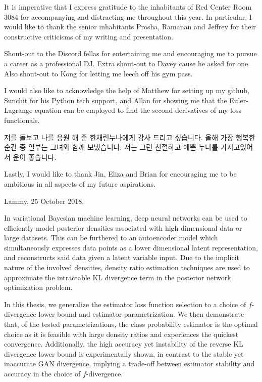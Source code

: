 \documentclass[honours,12pt, twoside]{unswthesis}
\numberwithin{equation}{section}
\theoremstyle{definition}
\begin{document}
{\bigskip\noindent}It is imperative that I express gratitude to the inhabitants of Red Center Room 3084 for accompanying and distracting me throughout this year. In particular, I would like to thank the senior inhabitants Prosha, Ramanan and Jeffrey for their constructive criticisms of my writing and presentation.

{\bigskip\noindent}Shout-out to the Discord fellas for entertaining me and encouraging me to pursue a career as a professional DJ. Extra shout-out to Davey cause he asked for one. Also shout-out to Kong for letting me leech off his gym pass.

{\bigskip\noindent}I would also like to acknowledge the help of Matthew for setting up my github, Sunchit for his Python tech support, and Allan for showing me that the Euler-Lagrange equation can be employed to find the second derivatives of my loss functionals.

{\bigskip\noindent}저를 돌보고 나를 응원 해 준 한채린누나에게 감사 드리고 싶습니다. 올해 가장 행복한 순간 중 일부는 그녀와 함께 보냈습니다. 저는 그런 친절하고 예쁜 누나를 가지고있어서 운이 좋습니다.

{\bigskip\noindent}Lastly, I would like to thank Jin, Eliza and Brian for encouraging me to be ambitious in all aspects of my future aspirations.

{\bigskip\bigskip\bigskip\noindent}Lammy, 25 October 2018.

\afterpage{\cleardoublepage}


In variational Bayesian machine learning, deep neural networks can be used to efficiently model posterior densities associated with high dimensional data or large datasets. This can be furthered to an autoencoder model which simultaneously expresses data points as a lower dimensional latent representation, and reconstructs said data given a latent variable input. Due to the implicit nature of the involved densities, density ratio estimation techniques are used to approximate the intractable KL divergence term in the posterior network optimization problem. 

In this thesis, we generalize the estimator loss function selection to a choice of $f$-divergence lower bound and estimator parametrization. We then demonstrate that, of the tested parametrizations, the class probability estimator is the optimal choice as it is feasible with large density ratios and experiences the quickest convergence. Additionally, the high accuracy yet instability of the reverse KL divergence lower bound is experimentally shown, in contrast to the stable yet inaccurate GAN divergence, implying a trade-off between estimator stability and accuracy in the choice of $f$-divergence.
\afterpage{\clearpage}
\end{document}
